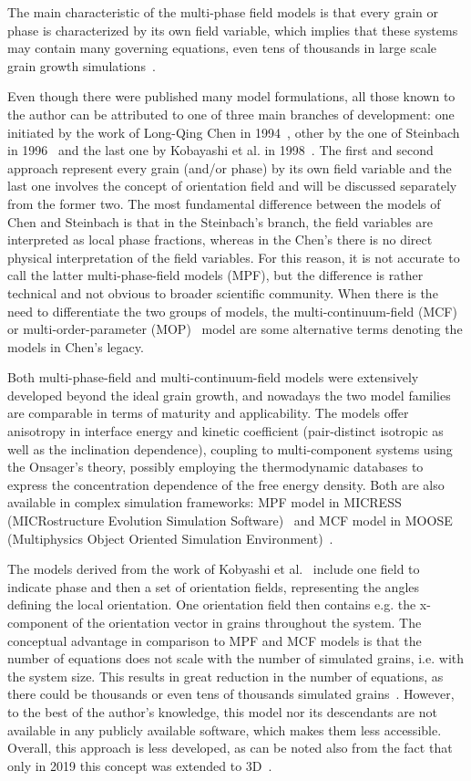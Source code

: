 	The main characteristic of the multi-phase field models is that every grain or phase is characterized by its own field variable, which implies that these systems may contain many governing equations, even tens of thousands in large scale grain growth simulations~\cite{Yadav2018}.
	
	Even though there were published many model formulations, all those known to the author can be attributed to one of three main branches of development: one initiated by the work of Long-Qing Chen in 1994~\cite{Chen1994}, other by the one of Steinbach in 1996~\cite{Steinbach1996} and the last one by Kobayashi et al. in 1998~\cite{Kobayashi1998}. The first and second approach represent every grain (and/or phase) by its own field variable and the last one involves the concept of orientation field and will be discussed separately from the former two. The most fundamental difference between the models of Chen and Steinbach is that in the Steinbach's branch, the field variables are interpreted as local phase fractions, whereas in the Chen's there is no direct physical interpretation of the field variables. For this reason, it is not accurate to call the latter multi-phase-field models (MPF), but the difference is rather technical and not obvious to broader scientific community. When there is the need to differentiate the two groups of models, the multi-continuum-field (MCF)~\cite{Moelans2009} or multi-order-parameter (MOP)~\cite{Daubner2023} model are some alternative terms denoting the models in Chen's legacy.
	
	Both multi-phase-field and multi-continuum-field models were extensively developed beyond the ideal grain growth, and nowadays the two model families are comparable in terms of maturity and applicability. The models offer anisotropy in interface energy and kinetic coefficient (pair-distinct isotropic as well as the inclination dependence), coupling to multi-component systems using the Onsager's theory, possibly employing the thermodynamic databases to express the concentration dependence of the free energy density. Both are also available in complex simulation frameworks: MPF model in MICRESS (MICRostructure Evolution Simulation Software)~\cite{Eiken2006} and MCF model in MOOSE (Multiphysics Object Oriented Simulation Environment)~\cite{Permann2020}.
	
	The models derived from the work of Kobyashi et al.~\cite{Kobayashi1998} include one field to indicate phase and then a set of orientation fields, representing the angles defining the local orientation. One orientation field then contains e.g. the x-component of the orientation vector in grains throughout the system. The conceptual advantage in comparison to MPF and MCF models is that the number of equations does not scale with the number of simulated grains, i.e. with the system size. This results in great reduction in the number of equations, as there could be thousands or even tens of thousands simulated grains~\cite{Yadav2016}. However, to the best of the author's knowledge, this model nor its descendants are not available in any publicly available software, which makes them less accessible. Overall, this approach is less developed, as can be noted also from the fact that only in 2019 this concept was extended to 3D~\cite{Sadamoto2019}. 
	
